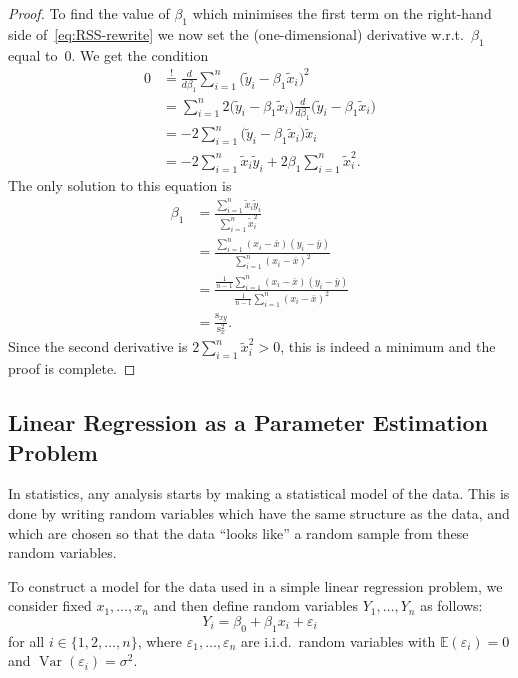\documentclass[
  a4paper,
]{article}
\theoremstyle{definition}
\theoremstyle{definition}
\theoremstyle{definition}
\theoremstyle{definition}
\theoremstyle{remark}
\begin{document}
\begin{proof}
To find the value of \(\beta_1\) which minimises the first term on the
right-hand side of~\eqref{eq:RSS-rewrite} we now set the
(one-dimensional) derivative w.r.t.~\(\beta_1\) equal to~\(0\). We get
the condition
\begin{align*}
    0
    &\overset{!}{=} \frac{d}{d\beta_1} \sum_{i=1}^n \bigl( \tilde y_i - \beta_1 \tilde x_i \bigr)^2 \\
    &= \sum_{i=1}^n 2 \bigl( \tilde y_i - \beta_1 \tilde x_i \bigr) \frac{d}{d\beta_1} \bigl( \tilde y_i - \beta_1 \tilde x_i \bigr) \\
    &= - 2 \sum_{i=1}^n \bigl( \tilde y_i - \beta_1 \tilde x_i \bigr) \tilde x_i \\
    &= -2  \sum_{i=1}^n \tilde x_i \tilde y_i + 2 \beta_1 \sum_{i=1}^n \tilde x_i^2.
  \end{align*}
The only solution to this equation is
\begin{align*}
    \beta_1
    &= \frac{\sum_{i=1}^n \tilde x_i \tilde y_i}{\sum_{i=1}^n \tilde x_i^2} \\
    &= \frac{\sum_{i=1}^n (x_i - \bar x) (y_i - \bar y)}{\sum_{i=1}^n (x_i - \bar x)^2} \\
    &= \frac{\frac{1}{n-1}\sum_{i=1}^n (x_i - \bar x) (y_i - \bar y)}{\frac{1}{n-1}\sum_{i=1}^n (x_i - \bar x)^2} \\
    &= \frac{\mathrm{s}_{xy}}{\mathrm{s}_x^2}.
  \end{align*}
Since the second derivative is \(2 \sum_{i=1}^n \tilde x_i^2 > 0\),
this is indeed a minimum and the proof is complete.
\end{proof}

\subsection{Linear Regression as a Parameter Estimation Problem}\label{linear-regression-as-a-parameter-estimation-problem}

In statistics, any analysis starts by making a statistical model of
the data. This is done by writing random variables which have the
same structure as the data, and which are chosen so that the data
``looks like'' a random sample from these random variables.

To construct a model for the data used in a simple linear regression problem,
we consider fixed \(x_1, \ldots, x_n\) and then define random variables \(Y_1,
\ldots, Y_n\) as follows:
\begin{equation}
  Y_i
  = \beta_0 + \beta_1 x_i + \varepsilon_i \label{eq:regression}
\end{equation}
for all \(i \in \{1, 2, \ldots, n\}\), where \(\varepsilon_1, \ldots, \varepsilon_n\)
are i.i.d.~random variables with \(\mathbb{E}(\varepsilon_i) = 0\) and
\(\mathop{\mathrm{Var}}(\varepsilon_i) = \sigma^2\).
\end{document}
